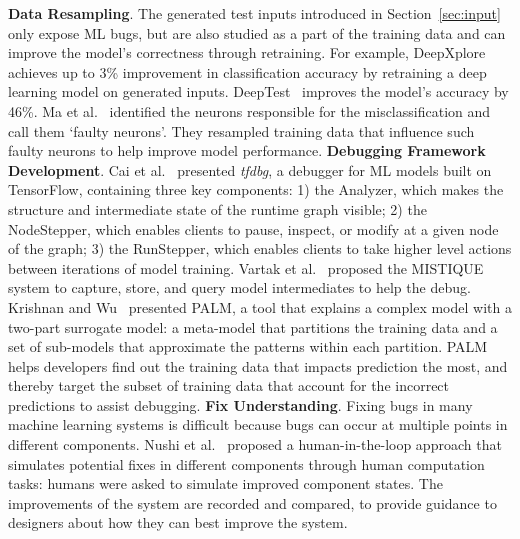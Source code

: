 \label{sec:debug}
\noindent \textbf{Data Resampling}.
The generated test inputs introduced in Section~\ref{sec:input} only expose ML bugs, but are also studied as a part of the training data and can improve the model's correctness through retraining.
For example, DeepXplore achieves up to 3\% improvement in classification accuracy by retraining a deep learning model on generated inputs.
DeepTest~ improves the model's accuracy by 46\%.
Ma et al.~ identified the neurons responsible for the misclassification and call them `faulty neurons'.
They resampled training data that influence such faulty neurons to help improve model performance.
\noindent\textbf{Debugging Framework Development}.
Cai et al.~ presented \emph{tfdbg},
a debugger for ML models built on TensorFlow, containing three key components:
1) the Analyzer, which makes the structure and intermediate state of the runtime graph visible;
2) the NodeStepper, which enables clients to pause, inspect, or modify at a given node of the graph;
3) the RunStepper, which enables clients to take higher level actions between iterations of model training.
Vartak et al.~ proposed the MISTIQUE system to capture, store, and query model intermediates to help the debug.
Krishnan and Wu~ presented PALM, a tool that explains a complex model with a two-part surrogate model: a meta-model that partitions the training data and a set of sub-models that approximate the patterns within each partition.
PALM helps developers find out the training data that impacts prediction the most, and thereby target the subset of training data that account for the incorrect predictions to assist debugging.
\noindent \textbf{Fix Understanding}.
Fixing bugs in many machine learning systems is difficult because bugs can occur at multiple points in different components.
Nushi et al.~ proposed a human-in-the-loop approach that simulates potential fixes in different components through human computation tasks: humans were asked to simulate improved component states.
The improvements of the system are recorded and compared, to provide guidance to designers about how they can best improve the system. 


